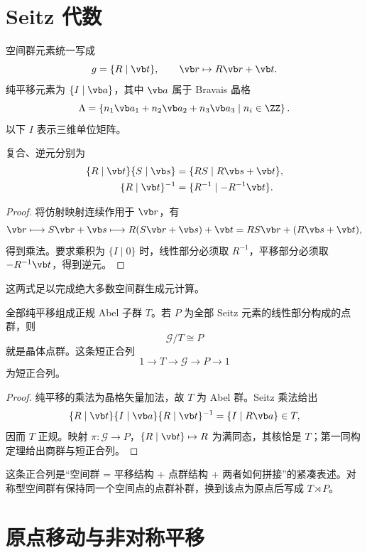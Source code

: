 \section{Seitz 代数}

\begin{definition}
空间群元素统一写成
\[
g=\{R\mid\vb t\},
\qquad
\vb r\mapsto R\vb r+\vb t.
\]
纯平移元素为 $\{I\mid\vb a\}$，其中 $\vb a$ 属于 Bravais 晶格
\[
\Lambda=\left\{n_1\vb a_1+n_2\vb a_2+n_3\vb a_3\mid n_i\in\ZZ\right\}.
\]
以下 $I$ 表示三维单位矩阵。
\end{definition}

\begin{proposition}
复合、逆元分别为
\begin{align}
\{R\mid\vb t\}\{S\mid\vb s\}
&=\{RS\mid R\vb s+\vb t\},\label{eq:seitz-product-app}\\
\{R\mid\vb t\}^{-1}
&=\{R^{-1}\mid-R^{-1}\vb t\}.
\label{eq:seitz-inverse-app}
\end{align}
\end{proposition}
\begin{proof}
将仿射映射连续作用于 $\vb r$，有
\[
\vb r\longmapsto S\vb r+\vb s
\longmapsto R(S\vb r+\vb s)+\vb t
=RS\vb r+(R\vb s+\vb t),
\]
得到乘法。要求乘积为 $\{I\mid0\}$ 时，线性部分必须取 $R^{-1}$，平移部分必须取 $-R^{-1}\vb t$，得到逆元。
\end{proof}
这两式足以完成绝大多数空间群生成元计算。

\begin{theorem}[空间群的平移正规子群]
全部纯平移组成正规 Abel 子群 $T$。若 $P$ 为全部 Seitz 元素的线性部分构成的点群，则
\[
\mathcal G/T\cong P
\]
就是晶体点群。这条短正合列
\[
1\longrightarrow T\longrightarrow\mathcal G
\longrightarrow P\longrightarrow1
\]
为短正合列。
\end{theorem}
\begin{proof}
纯平移的乘法为晶格矢量加法，故 $T$ 为 Abel 群。Seitz 乘法给出
\[
\{R\mid\vb t\}\{I\mid\vb a\}\{R\mid\vb t\}^{-1}
=\{I\mid R\vb a\}\in T,
\]
因而 $T$ 正规。映射 $\pi:\mathcal G\to P$，$\{R\mid\vb t\}\mapsto R$ 为满同态，其核恰是 $T$；第一同构定理给出商群与短正合列。
\end{proof}
这条正合列是“空间群 = 平移结构 + 点群结构 + 两者如何拼接”的紧凑表述。对称型空间群有保持同一个空间点的点群补群，换到该点为原点后写成 $T\rtimes P$。

\section{原点移动与非对称平移}

